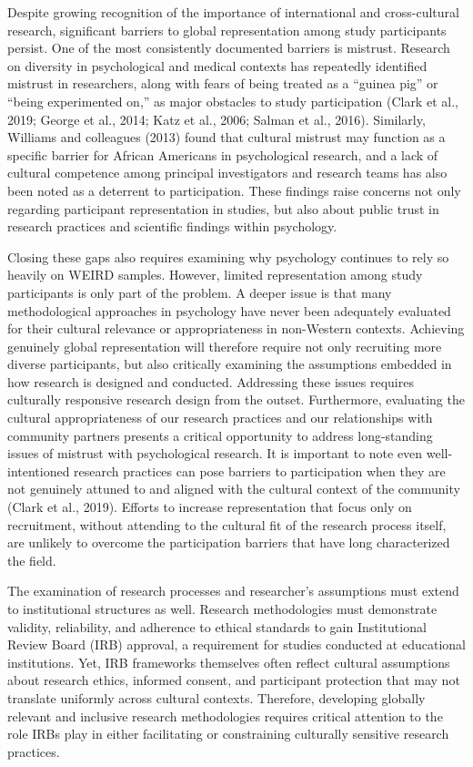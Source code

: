 \documentclass[
  11pt,
]{book}
\begin{document}
Despite growing recognition of the importance of international and cross-cultural research, significant barriers to global representation among study participants persist. One of the most consistently documented barriers is mistrust. Research on diversity in psychological and medical contexts has repeatedly identified mistrust in researchers, along with fears of being treated as a ``guinea pig'' or ``being experimented on,'' as major obstacles to study participation (Clark et al., 2019; George et al., 2014; Katz et al., 2006; Salman et al., 2016). Similarly, Williams and colleagues (2013) found that cultural mistrust may function as a specific barrier for African Americans in psychological research, and a lack of cultural competence among principal investigators and research teams has also been noted as a deterrent to participation. These findings raise concerns not only regarding participant representation in studies, but also about public trust in research practices and scientific findings within psychology.

Closing these gaps also requires examining why psychology continues to rely so heavily on WEIRD samples. However, limited representation among study participants is only part of the problem. A deeper issue is that many methodological approaches in psychology have never been adequately evaluated for their cultural relevance or appropriateness in non-Western contexts. Achieving genuinely global representation will therefore require not only recruiting more diverse participants, but also critically examining the assumptions embedded in how research is designed and conducted. Addressing these issues requires culturally responsive research design from the outset. Furthermore, evaluating the cultural appropriateness of our research practices and our relationships with community partners presents a critical opportunity to address long-standing issues of mistrust with psychological research. It is important to note even well-intentioned research practices can pose barriers to participation when they are not genuinely attuned to and aligned with the cultural context of the community (Clark et al., 2019). Efforts to increase representation that focus only on recruitment, without attending to the cultural fit of the research process itself, are unlikely to overcome the participation barriers that have long characterized the field.

The examination of research processes and researcher's assumptions must extend to institutional structures as well. Research methodologies must demonstrate validity, reliability, and adherence to ethical standards to gain Institutional Review Board (IRB) approval, a requirement for studies conducted at educational institutions. Yet, IRB frameworks themselves often reflect cultural assumptions about research ethics, informed consent, and participant protection that may not translate uniformly across cultural contexts. Therefore, developing globally relevant and inclusive research methodologies requires critical attention to the role IRBs play in either facilitating or constraining culturally sensitive research practices.
\end{document}
